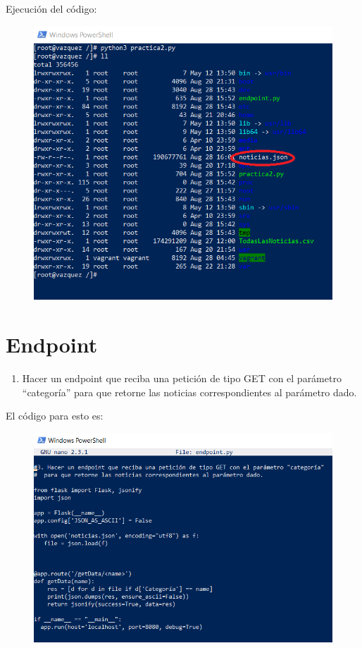 \documentclass[]{article}
\providecommand{\tightlist}{%
  \setlength{\itemsep}{0pt}\setlength{\parskip}{0pt}}
\begin{document}
Ejecución del código:

\begin{figure}[htbp]
\centering
\includegraphics{practica2pyex.png}
\end{figure}

\newpage

\section{Endpoint}\label{endpoint}

\begin{enumerate}
\def\labelenumi{\arabic{enumi}.}
\setcounter{enumi}{2}
\tightlist
\item
  Hacer un endpoint que reciba una petición de tipo GET con el parámetro
  ``categoría'' para que retorne las noticias correspondientes al
  parámetro dado.
\end{enumerate}

El código para esto es:

\begin{figure}[htbp]
\centering
\includegraphics{endpointpy.png}
\end{figure}
\end{document}
